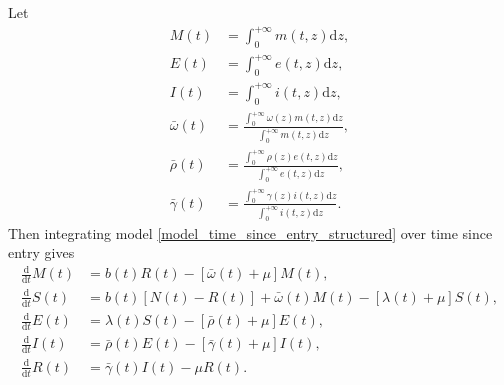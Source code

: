 \documentclass[USenglish]{article}
\newcommand{\md}{\mathrm{d}}
\begin{document}
Let
\begin{subequations}
  \begin{align}
    M(t)
    &= \int_0^{+\infty} m(t, z) \md z,
    \\
    E(t)
    &= \int_0^{+\infty} e(t, z) \md z,
    \\
    I(t)
    &= \int_0^{+\infty} i(t, z) \md z,
    \\
    \bar{\omega}(t)
    &= \frac{\int_0^{+\infty} \omega(z) m(t, z) \md z}
      {\int_0^{+\infty} m(t, z) \md z},
    \\
    \bar{\rho}(t)
    &= \frac{\int_0^{+\infty} \rho(z) e(t, z) \md z}
      {\int_0^{+\infty} e(t, z) \md z},
    \\
    \bar{\gamma}(t)
    &= \frac{\int_0^{+\infty} \gamma(z) i(t, z) \md z}
      {\int_0^{+\infty} i(t, z) \md z}.
  \end{align}
\end{subequations}
Then integrating model \eqref{model_time_since_entry_structured} over
time since entry gives
\begin{subequations}
  \label{model_time_since_entry_structured_agg_tse}
  \begin{align}
    \frac{\md}{\md t} M(t)
    &= b(t) R(t)
    - \left[\bar{\omega}(t) + \mu\right] M(t),
    \\
    \frac{\md}{\md t} S(t)
    &= b(t) \left[N(t) - R(t)\right]
    + \bar{\omega}(t) M(t)
    - [\lambda(t) + \mu] S(t),
    \\
    \frac{\md}{\md t} E(t)
    &= \lambda(t) S(t)
    - \left[\bar{\rho}(t) + \mu\right] E(t),
    \\
    \frac{\md}{\md t} I(t)
    &= \bar{\rho}(t) E(t)
    - \left[\bar{\gamma}(t) + \mu\right] I(t),
    \\
    \frac{\md}{\md t} R(t)
    &= \bar{\gamma}(t) I(t)
    - \mu R(t).
  \end{align}
\end{subequations}
\end{document}
